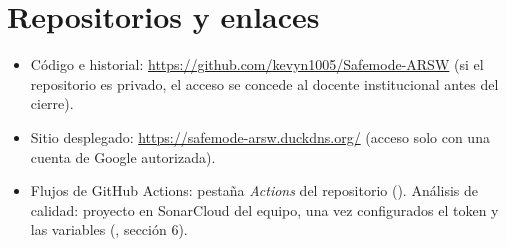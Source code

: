 \section{Repositorios y enlaces}
\begin{itemize}
  \item Código e historial: \url{https://github.com/kevyn1005/Safemode-ARSW} (si el repositorio es privado, el acceso se concede al docente
  institucional antes del cierre).
  \item Sitio desplegado: \url{https://safemode-arsw.duckdns.org/} (acceso solo con una cuenta de Google autorizada).
  \item Flujos de GitHub Actions: pestaña \emph{Actions} del repositorio (). Análisis de calidad: proyecto en SonarCloud del
  equipo, una vez configurados el token y las variables (, sección 6).
\end{itemize}


